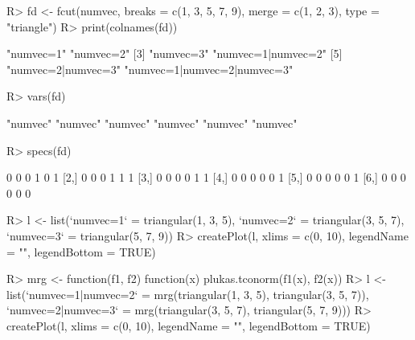 \documentclass{article}\usepackage[]{graphicx}\usepackage[]{color}
\begin{document}
\begin{Schunk}
% --begin: "fcut.merge2"
\begin{Sinput}
R> fd <- fcut(numvec, breaks = c(1, 3, 5, 7, 9), merge = c(1, 2, 3), type = "triangle")
R> print(colnames(fd))
\end{Sinput}
\begin{Soutput}
[1] "numvec=1"                   "numvec=2"                  
[3] "numvec=3"                   "numvec=1|numvec=2"         
[5] "numvec=2|numvec=3"          "numvec=1|numvec=2|numvec=3"
\end{Soutput}
%
% --end: "fcut.merge2"
\end{Schunk}

\begin{Schunk}
% --begin: "fcut.varsspecs"
\begin{Sinput}
R> vars(fd)
\end{Sinput}
\begin{Soutput}
[1] "numvec" "numvec" "numvec" "numvec" "numvec" "numvec"
\end{Soutput}
\begin{Sinput}
R> specs(fd)
\end{Sinput}
\begin{Soutput}
     [,1] [,2] [,3] [,4] [,5] [,6]
[1,]    0    0    0    1    0    1
[2,]    0    0    0    1    1    1
[3,]    0    0    0    0    1    1
[4,]    0    0    0    0    0    1
[5,]    0    0    0    0    0    1
[6,]    0    0    0    0    0    0
\end{Soutput}
%
% --end: "fcut.varsspecs"
\end{Schunk}


\begin{Schunk}
\begin{Sinput}
R> l <- list(`numvec=1` = triangular(1, 3, 5), `numvec=2` = triangular(3, 5, 
       7), `numvec=3` = triangular(5, 7, 9))
R> createPlot(l, xlims = c(0, 10), legendName = "", legendBottom = TRUE)
\end{Sinput}
\end{Schunk}

\begin{Schunk}
\begin{Sinput}
R> mrg <- function(f1, f2) {
       function(x) {
           plukas.tconorm(f1(x), f2(x))
       }
   }
R> l <- list(`numvec=1|numvec=2` = mrg(triangular(1, 3, 5), triangular(3, 5, 
       7)), `numvec=2|numvec=3` = mrg(triangular(3, 5, 7), triangular(5, 7, 
       9)))
R> createPlot(l, xlims = c(0, 10), legendName = "", legendBottom = TRUE)
\end{Sinput}
\end{Schunk}
\end{document}
